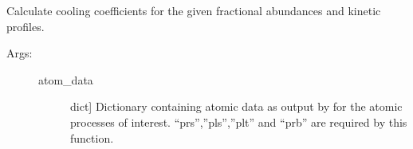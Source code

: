 \documentclass[letterpaper,10pt,english]{sphinxmanual}
\begin{document}

\begin{fulllineitems}
\label{\detokenize{aurora:aurora.atomic.get_cooling_factors}}
Calculate cooling coefficients for the given fractional abundances and kinetic profiles.
\begin{description}
\item[{Args:}] \leavevmode\begin{description}
\item[{atom\_data}] \leavevmode{[}dict{]}
Dictionary containing atomic data as output by {\hyperref[\detokenize{aurora:aurora.atomic.get_atom_data}]{}}
for the atomic processes of interest. “prs”,”pls”,”plt” and “prb” are required by this function.

\end{description}

\end{description}

\end{fulllineitems}

\end{document}

